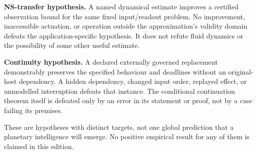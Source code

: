 \textbf{NS-transfer hypothesis.} A named dynamical estimate improves a certified observation bound for the same fixed input/readout problem. No improvement, inaccessible actuation, or operation outside the approximation's validity domain defeats the application-specific hypothesis. It does not refute fluid dynamics or the possibility of some other useful estimate.

\textbf{Continuity hypothesis.} A declared externally governed replacement demonstrably preserves the specified behaviour and deadlines without an original-host dependency. A hidden dependency, changed input order, replayed effect, or unmodelled interruption defeats that instance. The conditional continuation theorem itself is defeated only by an error in its statement or proof, not by a case failing its premises.

These are hypotheses with distinct targets, not one global prediction that a planetary intelligence will emerge. No positive empirical result for any of them is claimed in this edition.
